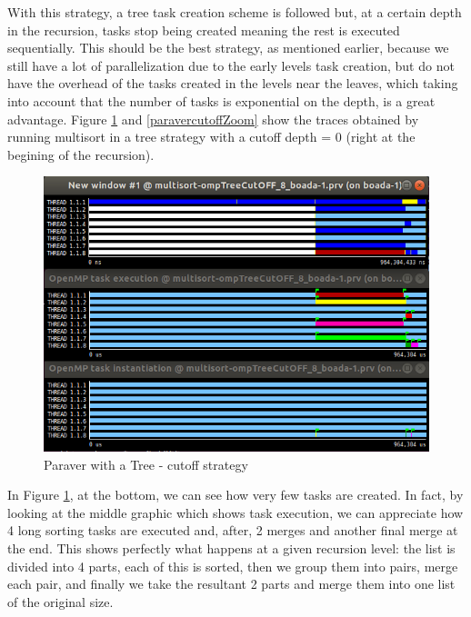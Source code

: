 \documentclass[12]{article}
\begin{document}
With this strategy, a tree task creation scheme is followed but, at a certain depth in the recursion, tasks stop being created meaning the rest is executed sequentially. This should be the best strategy, as mentioned earlier, because we still have a lot of parallelization due to the early levels task creation, but do not have the overhead of the tasks created in the levels near the leaves, which taking into account that the number of tasks is exponential on the depth, is a great advantage. Figure \ref{paravercutoff} and \ref{paravercutoffZoom} show the traces obtained by running multisort in a tree strategy with a cutoff depth = 0 (right at the begining of the recursion).
\\
\medskip
\begin{figure}[H]
    \centering
    \includegraphics[scale=0.75]{images/paraverTreeCutoffNoZoom.PNG}
    \caption{Paraver with a Tree - cutoff strategy}
    \label{paravercutoff}
\end{figure}
In Figure \ref{paravercutoff}, at the bottom, we can see how very few tasks are created. In fact, by looking at the middle graphic which shows task execution, we can appreciate how 4 long sorting tasks are executed and, after, 2 merges and another final merge at the end. This shows perfectly what happens at a given recursion level: the list is divided into 4 parts, each of this is sorted, then we group them into pairs, merge each pair, and finally we take the resultant 2 parts and merge them into one list of the original size.
\end{document}
